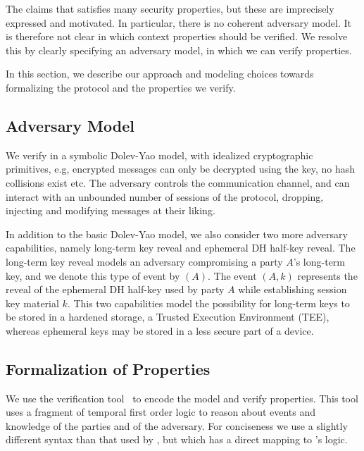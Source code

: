 The \mEdhoc{} \mSpec{} \cite{our-analysis-selander-lake-edhoc-01} claims
that \mEdhoc{} satisfies many security properties, but these are imprecisely
expressed and motivated.
%
In particular, there is no coherent adversary model.
%
It is therefore not clear in which context properties should be verified.
%
We resolve this by clearly specifying an adversary model, in which we can verify
properties.
%

In this section, we describe our approach and modeling choices towards
formalizing the \mEdhoc{} protocol and the properties we verify.
%

\subsection{Adversary Model}\label{sec:threat-model}
We verify \mEdhoc{} in a symbolic Dolev-Yao model, with idealized
cryptographic primitives, e.g, encrypted messages can only be
decrypted using the key, no hash collisions exist etc.
%
The adversary controls the
communication channel, and can interact with an unbounded number of sessions
of the protocol, dropping, injecting and modifying messages at their liking.
%

In addition to the basic Dolev-Yao model, we also consider two more adversary
capabilities, namely long-term key reveal and ephemeral DH half-key reveal.
%
The long-term key reveal models an adversary compromising a party $A$'s
long-term key, and we denote this type of event by \mRevLTK$(A)$.
%
The event \mRevEph$(A, k)$ represents the reveal of the ephemeral DH half-key
used by party $A$ while establishing session key material $k$.
%
This two capabilities model the possibility for long-term keys to be stored in a
hardened storage, a Trusted Execution Environment (TEE), whereas ephemeral keys
may be stored in a less secure part of a device.
%

\subsection{Formalization of Properties}
\label{sec:desired-properties}
%
We use the \mTamarin{} verification
tool~\cite{DBLP:conf/cav/MeierSCB13} to encode the model and verify properties.
%
This tool uses a fragment of temporal first order logic to reason about
events and knowledge of the parties and of the adversary.
%
For conciseness we use a slightly different syntax than
that used by \mTamarin{}, but which has a direct mapping to \mTamarin{}'s logic.
%


